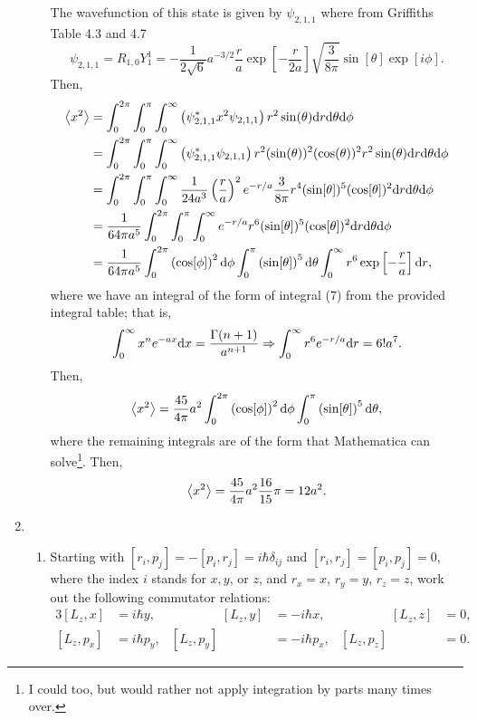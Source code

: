 \documentclass[a4paper, 12pt]{config/homework}
\begin{document}
\begin{enumerate}
\begin{enumerate}[label=(\alph*)]
The wavefunction of this state is given by \(\psi_{2,1,1}\) where from Griffiths Table 4.3 and 4.7
\[\psi_{2,1,1} = R_{1,0}Y_1^1 = -\frac{1}{2\sqrt{6}}a^{-3/2}\frac{r}{a}\exp\left[-\frac{r}{2a}\right]\sqrt{\frac{3}{8\pi}}\sin[\theta]\exp\left[i\phi\right].\]
Then,
\begin{align*}
\left\langle x^2 \right\rangle &= \int_{0}^{2\pi}{\int_{0}^{\pi}{\int_{0}^{\infty}{
    \left(\psi_{2,1,1}^* x^2 \psi_{2,1,1}\right) r^2\sin(\theta)
 \text{d}r} \text{d}\theta} \text{d}\phi}
\\&= \int_{0}^{2\pi}{\int_{0}^{\pi}{\int_{0}^{\infty}{
    \left(\psi_{2,1,1}^* \psi_{2,1,1}\right) r^2(\sin(\theta))^2(\cos(\theta))^2r^2\sin(\theta)
 \text{d}r} \text{d}\theta} \text{d}\phi}
\\&= \int_{0}^{2\pi}{\int_{0}^{\pi}{\int_{0}^{\infty}{
    \frac{1}{24a^3}\left(\frac{r}{a}\right)^2e^{-r/a}\frac{3}{8\pi} r^4(\sin[\theta])^5(\cos[\theta])^2
 \text{d}r} \text{d}\theta} \text{d}\phi}
\\&= \frac{1}{64\pi a^5} \int_{0}^{2\pi}{\int_{0}^{\pi}{\int_{0}^{\infty}{
    e^{-r/a} r^6 (\sin[\theta])^5 (\cos[\theta])^2
 \text{d}r} \text{d}\theta} \text{d}\phi}
\\&= \frac{1}{64\pi a^5}
\int_{0}^{2\pi}{\left(\cos[\phi]\right)^2 \text{d}\phi}
\int_{0}^{\pi}{\left(\sin[\theta]\right)^5 \text{d}\theta}
\int_{0}^{\infty}{r^6\exp\left[-\frac{r}{a}\right] \text{d}r},
\end{align*}
where we have an integral of the form of integral (7) from the provided integral table; that is,
\[\int_{0}^{\infty}{x^n e^{-ax} \text{d}x}=\frac{\Gamma(n+1)}{a^{n+1}}
\Rightarrow \int_{0}^{\infty}{r^{6} e^{-r/a} \text{d}r} = 6! a^7.\]
Then,
\[\left\langle x^2 \right\rangle = \frac{45}{4\pi}a^2 \int_{0}^{2\pi}{\left(\cos[\phi]\right)^2 \text{d}\phi}
\int_{0}^{\pi}{\left(\sin[\theta]\right)^5 \text{d}\theta},\]
where the remaining integrals are of the form that Mathematica can solve\footnote{I could too, but would rather not apply integration by parts many times over.}.
Then,
\[\left\langle x^2 \right\rangle = \frac{45}{4\pi}a^2 \frac{16}{15} \pi = 12 a^2.\]

\end{enumerate}
\pagebreak
\item \begin{enumerate}[label=(\alph*)]
\item Starting with \([r_i,p_j]=-[p_i,r_j]=i\hbar\delta_{ij}\) and \([r_i,r_j]=[p_i,p_j]=0\), where the index \(i\) stands for \(x,y\), or \(z\), and \(r_x=x\), \(r_y=y\), \(r_z=z\), work out the following commutator relations:
\begin{alignat*}{3}
[L_z,x] & =i\hbar y, & \qquad\qquad [L_z,y] & =-i\hbar x, & \qquad\qquad [L_z,z] & =0, \\
[L_z,p_x]&=i\hbar p_y, & [L_z, p_y]&=-i\hbar p_x, & [L_z, p_z]&=0.
\end{alignat*} \bigskip


\end{enumerate}
\end{enumerate}
\end{document}
